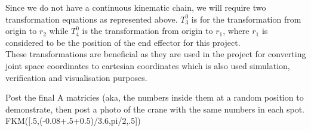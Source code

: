 \documentclass{UoNMCHA}
\numberwithin{equation}{section}
\begin{document}
Since we do not have a continuous kinematic chain, we will require two transformation equations as represented above. $T_3^0$ is for the transformation from origin to $r_2$ while $T_4^0$ is the transformation from origin to $r_1$, where $r_1$ is considered to be the position of the end effector for this project. \\
These transformations are beneficial as they are used in the project for converting joint space coordinates to cartesian coordinates which is also used simulation, verification and visualisation purposes.

Post the final A matricies (aka, the numbers inside them at a random position to demonstrate, then post a photo of the crane with the same numbers in each spot.  \\
FKM([.5,(-0.08+.5+0.5)/3.6,pi/2,.5])
\end{document}
